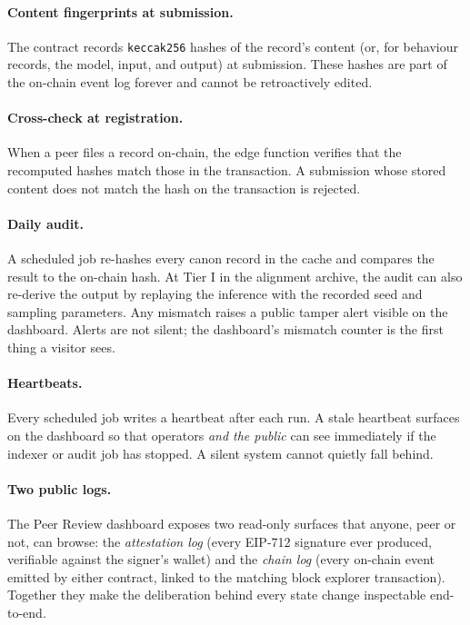 \documentclass[11pt,a4paper]{article}
\begin{document}
\paragraph{Content fingerprints at submission.} The contract
records \texttt{keccak256} hashes of the record's content (or,
for behaviour records, the model, input, and output) at
submission. These hashes are part of the on-chain event log
forever and cannot be retroactively edited.

\paragraph{Cross-check at registration.} When a peer files a
record on-chain, the edge function verifies that the recomputed
hashes match those in the transaction. A submission whose
stored content does not match the hash on the transaction is
rejected.

\paragraph{Daily audit.} A scheduled job re-hashes every canon
record in the cache and compares the result to the on-chain
hash. At Tier I in the alignment archive, the audit can also
re-derive the output by replaying the inference with the
recorded seed and sampling parameters. Any mismatch raises a
public tamper alert visible on the dashboard. Alerts are not
silent; the dashboard's mismatch counter is the first thing a
visitor sees.

\paragraph{Heartbeats.} Every scheduled job writes a heartbeat
after each run. A stale heartbeat surfaces on the dashboard so
that operators \emph{and the public} can see immediately if the
indexer or audit job has stopped. A silent system cannot
quietly fall behind.

\paragraph{Two public logs.} The Peer Review dashboard exposes
two read-only surfaces that anyone, peer or not, can browse:
the \emph{attestation log} (every EIP-712 signature ever
produced, verifiable against the signer's wallet) and the
\emph{chain log} (every on-chain event emitted by either
contract, linked to the matching block explorer transaction).
Together they make the deliberation behind every state change
inspectable end-to-end.
\end{document}
